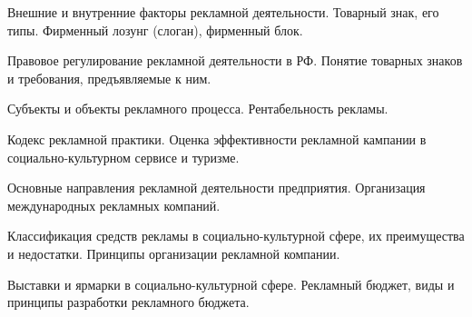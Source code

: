 \documentclass[
	14pt,
	a4paper,
	]
	{scrartcl}
\begin{document}
\vfill

\newpage


\shapk
{}
\setcounter{zad}{0}

\vfill
\z Внешние и внутренние факторы рекламной деятельности.
 \vfill
\z Товарный знак, его типы. Фирменный лозунг (слоган), фирменный блок.
 \vfill

\vfill

\newpage


\shapk
{}
\setcounter{zad}{0}

\vfill
\z Правовое регулирование рекламной деятельности в РФ.
 \vfill
\z Понятие товарных знаков и требования, предъявляемые к ним.
 \vfill

\vfill

\newpage


\shapk
{}
\setcounter{zad}{0}

\vfill
\z Субъекты и объекты рекламного процесса.
 \vfill
\z Рентабельность рекламы.
 \vfill

\vfill

\newpage


\shapk
{}
\setcounter{zad}{0}

\vfill
\z Кодекс рекламной практики.
 \vfill
\z Оценка эффективности рекламной кампании в социально-культурном сервисе и туризме.
 \vfill

\vfill

\newpage


\shapk
{}
\setcounter{zad}{0}

\vfill
\z Основные направления рекламной деятельности предприятия.
 \vfill
\z Организация международных рекламных компаний.
 \vfill

\vfill

\newpage


\shapk
{}
\setcounter{zad}{0}

\vfill
\z Классификация средств рекламы в социально-культурной сфере, их преимущества и недостатки.
 \vfill
\z Принципы организации рекламной компании.
 \vfill

\vfill

\newpage


\shapk
{}
\setcounter{zad}{0}

\vfill
\z Выставки и ярмарки в социально-культурной сфере.
 \vfill
\z Рекламный бюджет, виды и принципы разработки рекламного бюджета.
 \vfill
\end{document}
